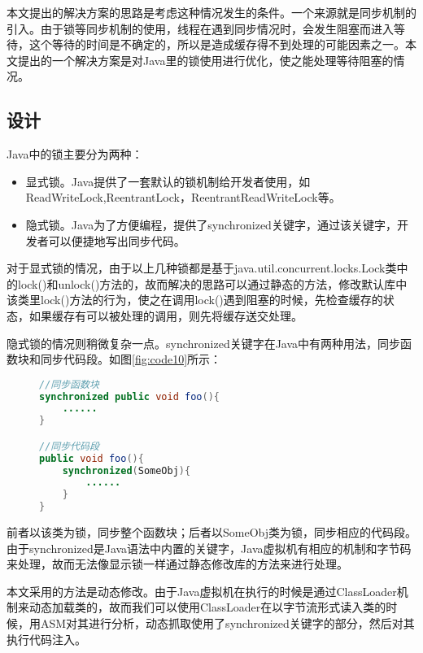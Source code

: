 本文提出的解决方案的思路是考虑这种情况发生的条件。一个来源就是同步机制的引入。由于锁等同步机制的使用，线程在遇到同步情况时，会发生阻塞而进入等待，这个等待的时间是不确定的，所以是造成缓存得不到处理的可能因素之一。本文提出的一个解决方案是对Java里的锁使用进行优化，使之能处理等待阻塞的情况。

\subsection{设计}

Java中的锁主要分为两种：

\begin{itemize}
	\item 显式锁。Java提供了一套默认的锁机制给开发者使用，如ReadWriteLock,ReentrantLock，ReentrantReadWriteLock等。
	\item 隐式锁。Java为了方便编程，提供了synchronized关键字，通过该关键字，开发者可以便捷地写出同步代码。
\end{itemize}

对于显式锁的情况，由于以上几种锁都是基于java.util.concurrent.locks.Lock类中的lock()和unlock()方法的，故而解决的思路可以通过静态的方法，修改默认库中该类里lock()方法的行为，使之在调用lock()遇到阻塞的时候，先检查缓存的状态，如果缓存有可以被处理的调用，则先将缓存送交处理。

隐式锁的情况则稍微复杂一点。synchronized关键字在Java中有两种用法，同步函数块和同步代码段。如图\ref{fig:code10}所示：

\begin{figure}[!htp]
\begin{lstlisting}[language=Java]
//同步函数块
synchronized public void foo(){
	......
}

//同步代码段
public void foo(){
	synchronized(SomeObj){
		......
	}
}
\end{lstlisting}
\end{figure}

前者以该类为锁，同步整个函数块；后者以SomeObj类为锁，同步相应的代码段。由于synchronized是Java语法中内置的关键字，Java虚拟机有相应的机制和字节码来处理，故而无法像显示锁一样通过静态修改库的方法来进行处理。

本文采用的方法是动态修改。由于Java虚拟机在执行的时候是通过ClassLoader机制来动态加载类的，故而我们可以使用ClassLoader在以字节流形式读入类的时候，用ASM对其进行分析，动态抓取使用了synchronized关键字的部分，然后对其执行代码注入。

